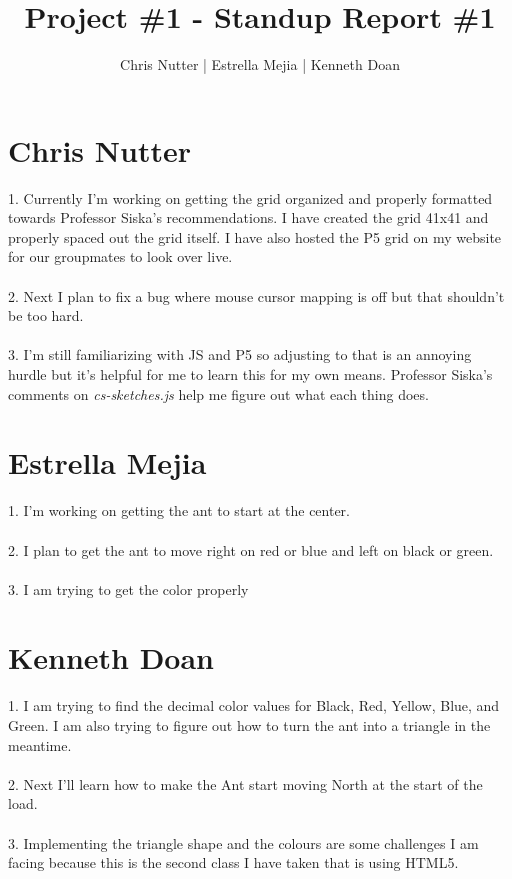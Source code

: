 \documentclass[12pt,a4paper]{article}
\title{Project \#1 - Standup Report \#1}
\author{Chris Nutter | Estrella Mejia | Kenneth Doan}
\begin{document}
\maketitle

\section{Chris Nutter}
    1. Currently I'm working on getting the grid organized and properly formatted towards Professor Siska's recommendations.
    I have created the grid 41x41 and properly spaced out the grid itself. I have also hosted the P5 grid on my website 
    for our groupmates to look over live.
        \\\\
    2. Next I plan to fix a bug where mouse cursor mapping is off but that shouldn't be too hard.
        \\\\
    3. I'm still familiarizing with JS and P5 so adjusting to that is an annoying hurdle but it's helpful for 
    me to learn this for my own means. Professor Siska's comments on \emph{cs-sketches.js} help me 
    figure out what each thing does.   

\section{Estrella Mejia}
    1. I'm working on getting the ant to start at the center. 
        \\\\
    2. I plan to get the ant to move right on red or blue and left on black or green.
        \\\\
    3. I am trying to get the color properly 
 
\section{Kenneth Doan}
    1. I am trying to find the decimal color values for Black, Red, Yellow, Blue, and Green. 
    I am also trying to figure out how to turn the ant into a triangle in the meantime.
        \\\\
    2. Next I'll learn how to make the Ant start moving North at the start of the load.
        \\\\
    3. Implementing the triangle shape and the colours are some challenges 
    I am facing because this is the second class I have taken that is using HTML5.
  
\end{document}
